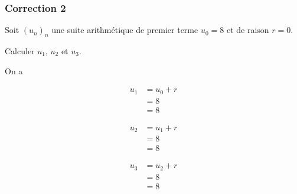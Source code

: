 \documentclass[15pt, mathserif]{beamer}
\begin{document}
\begin{frame}
\vspace{-10mm}
	\frametitle{Correction 2}
Soit $(u_n)_n$ une suite arithmétique de premier terme $u_0=8$ et de raison $r=0$. 
 
 Calculer $u_1$, $u_2$ et $u_3$. 
 
 On a 
 \begin{minipage}{0.25\textwidth} 
 
 \begin{align*} 
 u_1 &= u_0+r \\ &= 8 \\ &=8
 \end{align*} 
  
 \end{minipage} \hfil \begin{minipage}{0.25\textwidth} 
 
 \begin{align*} 
 u_2 &= u_1+r \\ &= 8 \\ &=8
 \end{align*} 
 
 \end{minipage} \hfil \begin{minipage}{0.25\textwidth} 
 
 \begin{align*} 
 u_3 &= u_2+r \\ &= 8 \\ &=8
 \end{align*} 
 
 \end{minipage} 
\end{frame}
\end{document}
